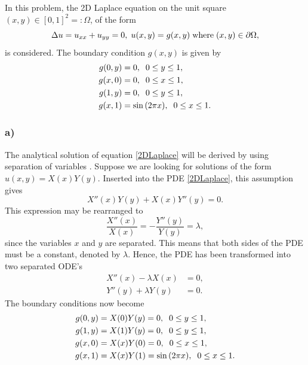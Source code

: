 In this problem, the 2D Laplace equation on the unit square $(x,y) \in [0,1]^2 =: \Omega$, of the form 
\begin{equation}
\label{2DLaplace}
    \Delta u = u_{xx} + u_{yy} = 0, \hspace{1mm} u(x,y) = g(x,y) \hspace{1mm} \text{where} \hspace{1mm} (x,y) \in \partial \Omega, 
\end{equation}
is considered. The boundary condition $g(x,y)$ is given by 
\begin{equation*}
\begin{split}
    g(0,y) &= 0, \hspace{2mm} 0 \leq y \leq 1, \\
    g(x,0) &= 0, \hspace{2mm} 0 \leq x \leq 1, \\
    g(1,y) &= 0, \hspace{2mm} 0 \leq y \leq 1, \\
    g(x,1) &= \sin{(2\pi x)}, \hspace{2mm} 0 \leq x \leq 1. 
\end{split}
\end{equation*}

\subsubsection{a)}

The analytical solution of equation \eqref{2DLaplace} will be derived by using separation of variables \cite{Owren}. Suppose we are looking for solutions of the form $u(x,y) = X(x)Y(y)$. Inserted into the PDE \eqref{2DLaplace}, this assumption gives
\begin{equation*}
    X''(x)Y(y) + X(x)Y''(y) = 0.
\end{equation*}
This expression may be rearranged to 
\begin{equation*}
    \frac{X''(x)}{X(x)} = -\frac{Y''(y)}{Y(y)} = \lambda, 
\end{equation*}
since the variables $x$ and $y$ are separated. This means that both sides of the PDE must be a constant, denoted by $\lambda$. Hence, the PDE has been transformed into two separated ODE's
\begin{align}
    X''(x)-\lambda X(x) &= 0, \label{SeparatedX}\\
    Y''(y)+\lambda Y(y) &= 0. \label{SeparatedY}
\end{align}
The boundary conditions now become
\begin{align}
    g(0,y) &= X(0)Y(y) = 0, \hspace{2mm} 0 \leq y \leq 1, \label{BoundaryY1}\\
    g(1,y) &= X(1)Y(y) = 0, \hspace{2mm} 0 \leq y \leq 1, \label{BoundaryY2}\\
    g(x,0) &= X(x)Y(0) = 0, \hspace{2mm} 0 \leq x \leq 1, \label{BoundaryX1}\\
    g(x,1) &= X(x)Y(1) = \sin{(2\pi x)}, \hspace{2mm} 0 \leq x \leq 1. \label{BoundaryX2}
\end{align}

